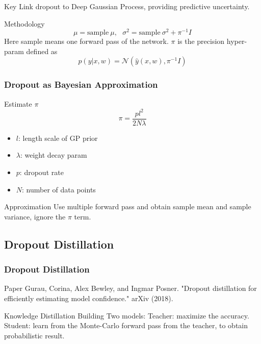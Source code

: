 \documentclass{beamer}
\begin{document}
\begin{frame}
\begin{frame}
\begin{frame}
\begin{frame}
\begin{frame}
\begin{block}{Key}
Link dropout to Deep Gaussian Process, providing predictive uncertainty.
\end{block}

\begin{block}{Methodology}
\[
\mu = \text{sample} \ \mu, \ \ \ \sigma^2 = \text{sample} \ \sigma^2 + \pi^{-1}I
\]
Here sample means one forward pass of the network. $\pi$ is the precision hyper-param defined as
\[
p(y|x,w) = \mathcal{N}(\hat{y}(x,w), \pi^{-1}I)
\]
\end{block}

\end{frame}

\begin{frame}
\frametitle{Dropout as Bayesian Approximation}
\begin{block}{Estimate $\pi$}
\[
\pi = \frac{pl^2}{2N\lambda}
\]
\begin{itemize}
\setlength\itemsep{0em}
\item $l$: length scale of GP prior
\item $\lambda$: weight decay param
\item $p$: dropout rate
\item $N$: number of data points
\end{itemize}
\end{block}

\begin{block}{Approximation}
Use multiple forward pass and obtain sample mean and sample variance, ignore the $\pi$ term.
\end{block}

\end{frame}


\subsection{Dropout Distillation}
\begin{frame}
\frametitle{Dropout Distillation}
\begin{block}{Paper}
Gurau, Corina, Alex Bewley, and Ingmar Posner. "Dropout distillation for efficiently estimating model confidence." arXiv (2018).
\end{block}

\begin{block}{Knowledge Distillation}
Building Two models:
Teacher: maximize the accuracy.
Student: learn from the Monte-Carlo forward pass from the teacher, to obtain probabilistic result.
\end{block}


\end{frame}
\end{frame}
\end{frame}
\end{frame}
\end{frame}
\end{document}
